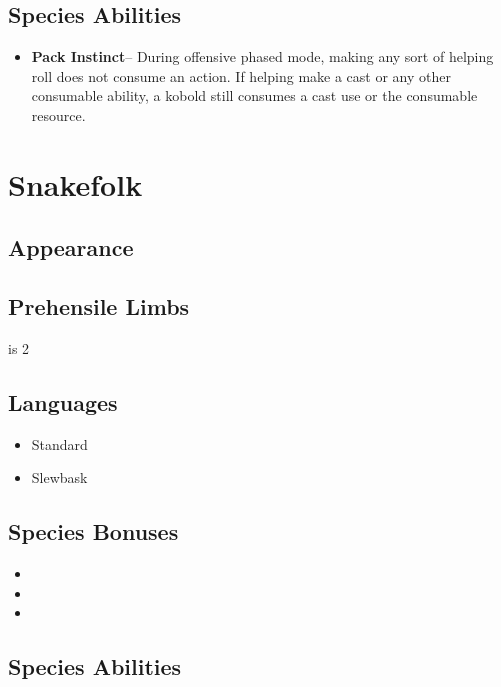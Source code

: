 {\subsection*{Species Abilities}

\begin{itemize}
	\item \textbf{Pack Instinct}-- During offensive phased mode, making any sort of helping roll does not consume an action. If helping make a cast or any other consumable ability, a kobold still consumes a cast use or the consumable resource.
\end{itemize}

\GRPpagebreak
\section{Snakefolk}

\subsection*{Appearance}

\subsection*{Prehensile Limbs}

 is 2

\subsection*{Languages}

\begin{itemize}
	\item Standard
	\item Slewbask
\end{itemize}

\subsection*{Species Bonuses}

\begin{itemize}
	\item {}
	\item {}
	\item {}
\end{itemize}

\subsection*{Species Abilities}

}
